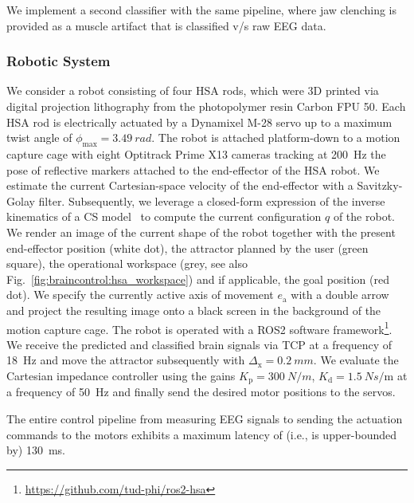 We implement a second classifier with the same pipeline, where jaw clenching is provided as a muscle artifact that is classified v/s raw EEG data. 
\subsubsection{Robotic System}
We consider a robot consisting of four \gls{HSA} rods, which were 3D printed via digital projection lithography %
from the photopolymer resin Carbon FPU 50. %
Each \gls{HSA} rod is electrically actuated by a Dynamixel M-28 servo up to a maximum twist angle of $\phi_\mathrm{max} = \SI{3.49}{rad}$.
The robot is attached platform-down to a motion capture cage with eight Optitrack Prime X13 cameras tracking at \SI{200}{Hz} the pose of reflective markers attached to the end-effector of the \gls{HSA} robot.
We estimate the current Cartesian-space velocity of the end-effector with a Savitzky-Golay filter. 
Subsequently, we leverage a closed-form expression of the inverse kinematics of a \gls{CS} model~\citep{stolzle2024experimental} to compute the current configuration $q$ of the robot.
We render an image of the current shape of the robot together with the present end-effector position (white dot), the attractor planned by the user (green square), the operational workspace (grey, see also Fig.~\ref{fig:braincontrol:hsa_workspace}) and if applicable, the goal position (red dot). 
We specify the currently active axis of movement $e_\mathrm{a}$ with a double arrow and project the resulting image onto a black screen in the background of the motion capture cage.
The robot is operated with a ROS2 software framework\footnote{\url{https://github.com/tud-phi/ros2-hsa}}. We receive the predicted and classified brain signals via TCP at a frequency of \SI{18}{Hz} and move the attractor subsequently with $\Delta_\mathrm{x} = \SI{0.2}{mm}$. We evaluate the Cartesian impedance controller using the gains $K_\mathrm{p} = \SI{300}{N \per m}$, $K_\mathrm{d} = \SI{1.5}{N s \per \meter}$ at a frequency of \SI{50}{Hz} and finally send the desired motor positions to the servos.

The entire control pipeline from measuring \gls{EEG} signals to sending the actuation commands to the motors exhibits a maximum latency of (i.e., is upper-bounded by)  \SI{130}{ms}.

